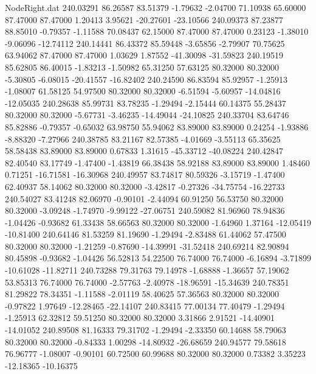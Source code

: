 \begin{filecontents}{NodeRight.dat}
 240.03291   86.26587   83.51379    -1.79632   -2.04700   71.10938   65.60000   87.47000   87.47000    1.20413    3.95621  -20.27601  -23.10566
 240.09373   87.23877   88.85010    -0.79357   -1.11588   70.08437   62.15000   87.47000   87.47000    0.23123   -1.38010   -9.06096  -12.74112
 240.14441   86.43372   85.59448    -3.65856   -2.79907   70.75625   63.94062   87.47000   87.47000    1.03629    1.87552  -41.30098  -31.59823
 240.19519   85.62805   86.40015    -1.83213   -1.50982   65.31250   57.63125   80.32000   80.32000   -5.30805   -6.08015  -20.41557  -16.82402
 240.24590   86.83594   85.92957    -1.25913   -1.08007   61.58125   54.97500   80.32000   80.32000   -6.51594   -5.60957  -14.04816  -12.05035
 240.28638   85.99731   83.78235    -1.29494   -2.15444   60.14375   55.28437   80.32000   80.32000   -5.67731   -3.46235  -14.49044  -24.10825
 240.33704   83.64746   85.82886    -0.79357   -0.65032   63.98750   55.94062   83.89000   83.89000    0.24254   -1.93886   -8.88320   -7.27966
 240.38785   83.21167   82.57385    -4.01669   -3.55113   65.35625   58.58438   83.89000   83.89000    0.67833    1.31615  -45.33712  -40.08224
 240.42847   82.40540   83.17749    -1.47400   -1.43819   66.38438   58.92188   83.89000   83.89000    1.48460    0.71251  -16.71581  -16.30968
 240.49957   83.74817   80.59326    -3.15719   -1.47400   62.40937   58.14062   80.32000   80.32000   -3.42817   -0.27326  -34.75754  -16.22733
 240.54027   83.41248   82.06970    -0.90101   -2.44094   60.91250   56.53750   80.32000   80.32000   -3.09248   -1.74970   -9.99122  -27.06751
 240.59082   81.96960   78.94836    -1.04426   -0.93682   61.33438   58.66563   80.32000   80.32000   -1.64960    1.37164  -12.05419  -10.81400
 240.64146   81.53259   81.19690    -1.29494   -2.83488   61.44062   57.47500   80.32000   80.32000   -1.21259   -0.87690  -14.39991  -31.52418
 240.69214   82.90894   80.45898    -0.93682   -1.04426   56.52813   54.22500   76.74000   76.74000   -6.16894   -3.71899  -10.61028  -11.82711
 240.73288   79.31763   79.14978    -1.68888   -1.36657   57.19062   53.85313   76.74000   76.74000   -2.57763   -2.40978  -18.96591  -15.34639
 240.78351   81.29822   78.34351    -1.11588   -2.01119   58.40625   57.36563   80.32000   80.32000   -0.97822    1.97649  -12.28465  -22.14107
 240.83415   77.00134   77.40479    -1.29494   -1.25913   62.32812   59.51250   80.32000   80.32000    3.31866    2.91521  -14.40901  -14.01052
 240.89508   81.16333   79.31702    -1.29494   -2.33350   60.14688   58.79063   80.32000   80.32000   -0.84333    1.00298  -14.80932  -26.68659
 240.94577   79.58618   76.96777    -1.08007   -0.90101   60.72500   60.99688   80.32000   80.32000    0.73382    3.35223  -12.18365  -10.16375

\end{filecontents}
